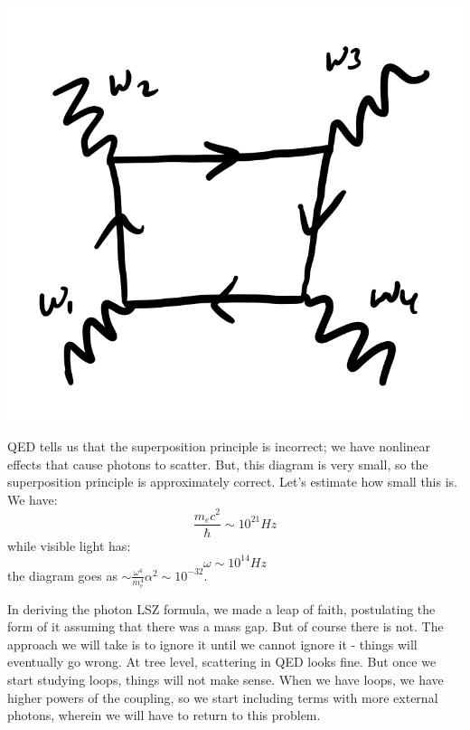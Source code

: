 \begin{center}
    \includegraphics[scale=0.35]{Lectures/Images/lec12-photonscatterdiagram.png}
\end{center}


QED tells us that the superposition principle is incorrect; we have nonlinear effects that cause photons to scatter. But, this diagram is very small, so the superposition principle is approximately correct. Let's estimate how small this is. We have:
\begin{equation}
    \frac{m_ec^2}{\hbar} \sim 10^{21}\si{Hz}
\end{equation}
while visible light has:
\begin{equation}
    \omega \sim 10^{14}\si{Hz}
\end{equation}
the diagram goes as $\sim \frac{\omega^4}{m_e^4}\alpha^2 \sim 10^{-32}$.

In deriving the photon LSZ formula, we made a leap of faith, postulating the form of it assuming that there was a mass gap. But of course there is not. The approach we will take is to ignore it until we cannot ignore it - things will eventually go wrong. At tree level, scattering in QED looks fine. But once we start studying loops, things will not make sense. When we have loops, we have higher powers of the coupling, so we start including terms with more external photons, wherein we will have to return to this problem.
